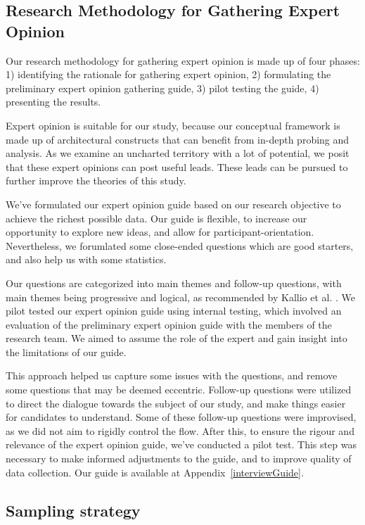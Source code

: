 \documentclass{bmcart}
\begin{document}
\subsection{Research Methodology for Gathering Expert Opinion}
Our research methodology for gathering expert opinion is made up of four phases: 1) identifying the rationale for gathering expert opinion, 2) formulating the preliminary expert opinion gathering guide, 3) pilot testing the guide, 4) presenting the results. 

Expert opinion is suitable for our study, because our conceptual framework is made up of architectural constructs that can benefit from in-depth probing and analysis. As we examine an uncharted territory with a lot of potential, we posit that these expert opinions can post useful leads. These leads can be pursued to further improve the theories of this study.

We've formulated our expert opinion guide based on our research objective to achieve the richest possible data. Our guide is flexible, to increase our opportunity to explore new ideas, and allow for participant-orientation. Nevertheless, we forumlated some close-ended questions which are good starters, and also help us with some statistics. 

Our questions are categorized into main themes and follow-up questions, with main themes being progressive and logical, as recommended by Kallio et al. \cite{kallio2016systematic}. We pilot tested our expert opinion guide using internal testing, which involved an evaluation of the preliminary expert opinion guide with the members of the research team. We aimed to assume the role of the expert and gain insight into the limitations of our guide.

This approach helped us capture some issues with the questions, and remove some questions that may be deemed eccentric. Follow-up questions were utilized to direct the dialogue towards the subject of our study, and make things easier for candidates to understand. Some of these follow-up questions were improvised, as we did not aim to rigidly control the flow. After this, to ensure the rigour and relevance of the expert opinion guide, we've conducted a pilot test. This step was necessary to make informed adjustments to the guide, and to improve quality of data collection. Our guide is available at Appendix~\ref{interviewGuide}.


\subsection{Sampling strategy}
\end{document}
